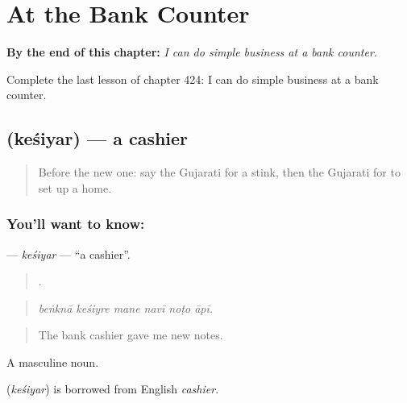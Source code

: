 
\chapter{At the Bank Counter}
\label{ch:gu-at-the-bank-counter}

\begin{chapteropening}
\textbf{By the end of this chapter:} \emph{I can do simple business at a bank counter.}

Complete the last lesson of chapter 424: I can do simple business at a bank counter.
\end{chapteropening}

\section[\texorpdfstring{\gu{કેશિયર} (keśiyar)}{કેશિયર (keśiyar)}]{ (keśiyar) — a cashier}

\label{lesson:GU-C424-kesiyar}



\begin{quote}
Before the new one: say the Gujarati for a stink, then the Gujarati for to set up a home.
\end{quote}

\subsection*{You'll want to know: }
\textbf{} — \emph{keśiyar} — \textquotedblleft{}a cashier\textquotedblright{}.

\begin{quote}
     .
\end{quote}

\begin{quote}
\emph{beṅknā keśiyre mane navī noṭo āpī.}
\end{quote}

\begin{quote}
The bank cashier gave me new notes.
\end{quote}

A masculine noun.

\begin{cousinweb}
\textbf{} (\emph{keśiyar}) is borrowed from English \emph{cashier}.
\end{cousinweb}


